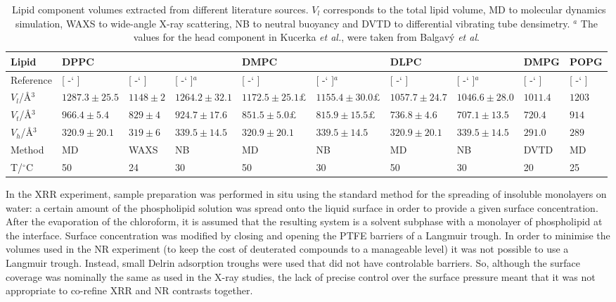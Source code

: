 \documentclass[twoside,twocolumn,9pt]{article}
\newcommand*{\citen}[1]{%
	\begingroup
	\romannumeral-`\x %
	\setcitestyle{numbers}%
	\cite{#1}%
	\endgroup
}
\begin{document}
\begin{table}
	\small
	\caption{\ Lipid component volumes extracted from different literature sources. $V_l$ corresponds to the total lipid volume, MD to molecular dynamics simulation, WAXS to wide-angle X-ray scattering, NB to neutral buoyancy and DVTD to differential vibrating tube densimetry. $^a$ The values for the head component in Kucerka \emph{et al.},\cite{Kucerka2004} were taken from Balgav\'{y} \emph{et al}.\cite{Balgavy2001}}
	\label{tab:water}
	\begin{tabular*}{\textwidth}{@{\extracolsep{\fill}}llllllllll}
		\hline
    Lipid & DPPC & & & DMPC & & DLPC & & DMPG & POPG \\
    \hline
    Reference & [\citen{Armen1998}] & [\citen{Sun1994}] & [\citen{Kucerka2004,Balgavy2001}]$^a$ & [\citen{Armen1998}] & [\citen{Kucerka2004,Balgavy2001}]$^a$ & [\citen{Armen1998}] & [\citen{Kucerka2004,Balgavy2001}]$^a$ & [\citen{Pan2012}] & [\citen{Kucerka2012}] \\
    \hline
    $V_l$/\AA$^3$ & $1287.3\pm25.5$ & $1148\pm2$ & $1264.2\pm32.1$ & $1172.5\pm25.1£$ & $1155.4\pm30.0£$ & $1057.7\pm24.7$ & $1046.6\pm28.0$ & $1011.4$ & $1203$ \\
    $V_t$/\AA$^3$ & $966.4\pm5.4$ & $829\pm4$ & $924.7\pm17.6$ & $851.5\pm5.0£$ & $815.9\pm15.5£$ & $736.8\pm4.6$ & $707.1\pm13.5$ & $720.4$ & $914$ \\
    $V_h$/\AA$^3$ & $320.9\pm20.1$ & $319\pm6$ & $339.5\pm14.5$ & $320.9\pm20.1$ & $339.5\pm14.5$ & $320.9\pm20.1$ & $339.5\pm14.5$ & $291.0$ & $289$ \\
    Method & MD & WAXS & NB & MD & NB & MD & NB & DVTD & MD \\
    T/$^\circ$C & 50 & 24 & 30 & 50 & 30 & 50 & 30 & 20 & 25 \\
	\end{tabular*}
\end{table}
In the XRR experiment, sample preparation was performed in situ using the standard method for the spreading of insoluble monolayers on water: a certain amount of the phospholipid solution was spread onto the liquid surface in order to provide a given surface concentration. After the evaporation of the chloroform, it is assumed that the resulting system is a solvent subphase with a monolayer of phospholipid at the interface. Surface concentration was modified by closing and opening the PTFE barriers of a Langmuir trough. In order to minimise the volumes used in the NR experiment (to keep the cost of deuterated compounds to a manageable level) it was not possible to use a Langmuir trough. Instead, small Delrin adsorption troughs were used that did not have controlable barriers. So, although the surface coverage was nominally the same as used in the X-ray studies, the lack of precise control over the surface pressure meant that it was not appropriate to co-refine XRR and NR contrasts together.
\end{document}
